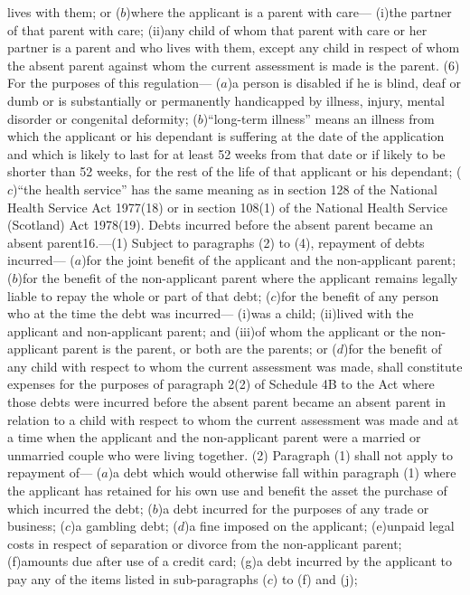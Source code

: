 \documentclass[a4paper]{article}
\begin{document}
lives with them; or
($b$)where the applicant is a parent with care—
(i)the partner of that parent with care;
(ii)any child of whom that parent with care or her partner is a parent and who
lives with them, except any child in respect of whom the absent parent against
whom the current assessment is made is the parent.
(6) For the purposes of this regulation—
($a$)a person is disabled if he is blind, deaf or dumb or is substantially or
permanently handicapped by illness, injury, mental disorder or congenital
deformity;
($b$)“long-term illness” means an illness from which the applicant or his
dependant is suffering at the date of the application and which is likely to
last for at least 52 weeks from that date or if likely to be shorter than 52
weeks, for the rest of the life of that applicant or his dependant;
($c$)“the health service” has the same meaning as in section 128 of the National
Health Service Act 1977(18) or in section 108(1) of the National Health Service
(Scotland) Act 1978(19).
Debts incurred before the absent parent became an absent parent16.—(1) Subject
to paragraphs (2) to (4), repayment of debts incurred—
($a$)for the joint benefit of the applicant and the non-applicant parent;
($b$)for the benefit of the non-applicant parent where the applicant remains
legally liable to repay the whole or part of that debt;
($c$)for the benefit of any person who at the time the debt was incurred—
(i)was a child;
(ii)lived with the applicant and non-applicant parent; and
(iii)of whom the applicant or the non-applicant parent is the parent, or both
are the parents; or
($d$)for the benefit of any child with respect to whom the current assessment was
made,
shall constitute expenses for the purposes of paragraph 2(2) of Schedule 4B to
the Act where those debts were incurred before the absent parent became an
absent parent in relation to a child with respect to whom the current assessment
was made and at a time when the applicant and the non-applicant parent were a
married or unmarried couple who were living together.
(2) Paragraph (1) shall not apply to repayment of—
($a$)a debt which would otherwise fall within paragraph (1) where the applicant
has retained for his own use and benefit the asset the purchase of which
incurred the debt;
($b$)a debt incurred for the purposes of any trade or business;
($c$)a gambling debt;
($d$)a fine imposed on the applicant;
(e)unpaid legal costs in respect of separation or divorce from the non-applicant
parent;
(f)amounts due after use of a credit card;
(g)a debt incurred by the applicant to pay any of the items listed in
sub-paragraphs ($c$) to (f) and (j);
\end{document}
